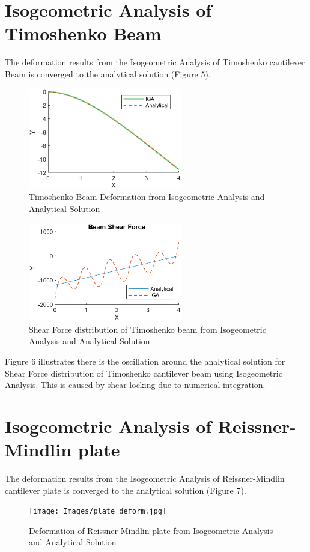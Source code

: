 \documentclass[12pt, a4paper]{report}
\begin{document}
\section{Isogeometric Analysis of Timoshenko Beam}
The deformation results from the Isogeometric Analysis of Timoshenko cantilever Beam is converged to the analytical solution (Figure 5).
\begin{figure}[htbp]
\centering
\includegraphics[width=0.6\textwidth]{Images/beam_deform.png}
\caption{Timoshenko Beam Deformation from Isogeometric Analysis and Analytical Solution}
\label{fig:timobeam}
\end{figure}


\begin{figure}[H]
\centering
\includegraphics[width=0.6\textwidth]{Images/beam shear force.png}
\caption{Shear Force distribution of Timoshenko beam from Isogeometric Analysis and Analytical Solution}
\label{fig:RMplateV}
\end{figure}
Figure 6 illustrates there is the oscillation around the analytical solution for Shear Force distribution of Timoshenko cantilever beam using Isogeometric Analysis. This is caused by shear locking due to numerical integration.

\section{Isogeometric Analysis of Reissner-Mindlin plate}
The deformation results from the Isogeometric Analysis of Reissner-Mindlin cantilever plate is converged to the analytical solution (Figure 7).
\begin{figure}[htbp]
\centering
\texttt{[image: Images/plate\_deform.jpg]}
\caption{Deformation of Reissner-Mindlin plate from Isogeometric Analysis and Analytical Solution}
\label{fig:RMplate}
\end{figure}
\end{document}
